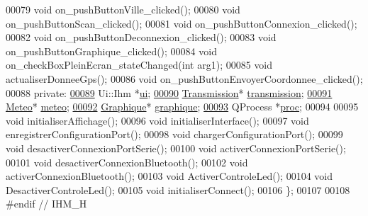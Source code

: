 \begin{DoxyCode}
00079     \textcolor{keywordtype}{void} on\_pushButtonVille\_clicked();              
00080     \textcolor{keywordtype}{void} on\_pushButtonScan\_clicked();               
00081     \textcolor{keywordtype}{void} on\_pushButtonConnexion\_clicked();          
00082     \textcolor{keywordtype}{void} on\_pushButtonDeconnexion\_clicked();        
00083     \textcolor{keywordtype}{void} on\_pushButtonGraphique\_clicked();          
00084     \textcolor{keywordtype}{void} on\_checkBoxPleinEcran\_stateChanged(\textcolor{keywordtype}{int} arg1);  
00085     \textcolor{keywordtype}{void} actualiserDonneeGps();                         
00086     \textcolor{keywordtype}{void} on\_pushButtonEnvoyerCoordonnee\_clicked();   
00088 \textcolor{keyword}{private}:
\hypertarget{ihm_8h_source.tex_l00089}{}\hyperlink{class_ihm_a0ac5f47856566ceeeca1720109bf70ea}{00089}     Ui::Ihm *\hyperlink{class_ihm_a0ac5f47856566ceeeca1720109bf70ea}{ui};                                    
\hypertarget{ihm_8h_source.tex_l00090}{}\hyperlink{class_ihm_aa8fa25758a4f3e47e07d1d98f6bbab33}{00090}     \hyperlink{class_transmission}{Transmission}* \hyperlink{class_ihm_aa8fa25758a4f3e47e07d1d98f6bbab33}{transmission};                     
\hypertarget{ihm_8h_source.tex_l00091}{}\hyperlink{class_ihm_af17b420166b2bb1b3e3b1c4b998a2102}{00091}     \hyperlink{class_meteo}{Meteo}* \hyperlink{class_ihm_af17b420166b2bb1b3e3b1c4b998a2102}{meteo};                                   
\hypertarget{ihm_8h_source.tex_l00092}{}\hyperlink{class_ihm_a990b3fe0efe66ae9da5e13a5e0a11291}{00092}     \hyperlink{class_graphique}{Graphique}* \hyperlink{class_ihm_a990b3fe0efe66ae9da5e13a5e0a11291}{graphique};                           
\hypertarget{ihm_8h_source.tex_l00093}{}\hyperlink{class_ihm_aa1bea3b8f9bad5c19a662a2b455895fb}{00093}     QProcess *\hyperlink{class_ihm_aa1bea3b8f9bad5c19a662a2b455895fb}{proc};                                 
00094 
00095     \textcolor{keywordtype}{void} initialiserAffichage();                
00096     \textcolor{keywordtype}{void} initialiserInterface();                
00097     \textcolor{keywordtype}{void} enregistrerConfigurationPort();        
00098     \textcolor{keywordtype}{void} chargerConfigurationPort();            
00099     \textcolor{keywordtype}{void} desactiverConnexionPortSerie();        
00100     \textcolor{keywordtype}{void} activerConnexionPortSerie();           
00101     \textcolor{keywordtype}{void} desactiverConnexionBluetooth();        
00102     \textcolor{keywordtype}{void} activerConnexionBluetooth();           
00103     \textcolor{keywordtype}{void} ActiverControleLed();                  
00104     \textcolor{keywordtype}{void} DesactiverControleLed();               
00105     \textcolor{keywordtype}{void} initialiserConnect();                  
00106 \};
00107 
00108 \textcolor{preprocessor}{#endif // IHM\_H}
\end{DoxyCode}

